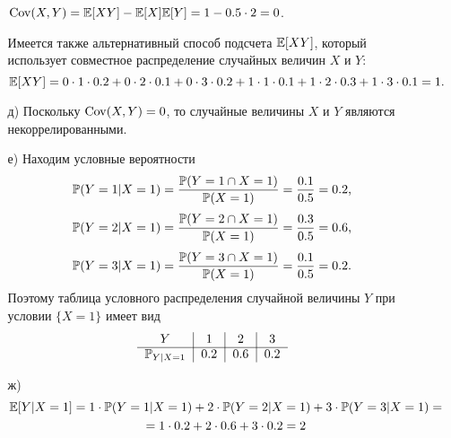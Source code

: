 \begin{enumerate}
\begin{enumerate}
$\Cov(X,Y) = \E[XY] - \E[X]\E[Y] = 1 - 0.5 \cdot 2 = 0$.

Имеется также альтернативный способ подсчета $\E[XY]$, который использует совместное распределение случайных величин $X$ и $Y$:
\[
\E[XY] = 0\cdot1\cdot0.2 + 0\cdot2\cdot0.1 + 0\cdot3\cdot0.2 + 1\cdot1\cdot0.1 + 1\cdot2\cdot0.3 + 1\cdot3\cdot0.1 = 1 \text{.}
\]

\item[д)] Поскольку $\Cov(X,Y) = 0$, то случайные величины $X$ и $Y$ являются некоррелированными.

\item[е)] Находим условные вероятности
\[
\P(Y=1 | X=1 ) = \frac{\P( Y=1  \cap  X=1 )}{\P( X=1 )} = \frac{0.1}{0.5} = 0.2 \text{,}
\]
\[
\P( Y=2 | X=1 ) = \frac{\P( Y=2  \cap  X=1 )}{\P( X=1 )} = \frac{0.3}{0.5} = 0.6 \text{,}
\]
\[
\P( Y=3 | X=1 ) = \frac{\P( Y=3  \cap  X=1 )}{\P( X=1 )} = \frac{0.1}{0.5} = 0.2 \text{.}
\]
Поэтому таблица условного распределения случайной величины $Y$ при условии $\{X = 1\}$ имеет вид
\[
\begin{tabular}{c|c|c|c}
  $Y$                          & $1$     & $2$     & $3$ \\ \cline{1-4}
  $\P_{Y| X=1 }$     & $0.2$   & $0.6$   & $0.2$ \\
\end{tabular}
\]

\item[ж)]
\begin{multline*}
\E[Y|X=1] = 1 \cdot \P(Y=1 | X=1) + 2 \cdot \P(Y=2 | X=1) + 3 \cdot \P(Y=3 | X=1) = \\
= 1 \cdot 0.2 + 2 \cdot 0.6 + 3 \cdot 0.2 = 2
\end{multline*}
\end{enumerate}
\end{enumerate}

